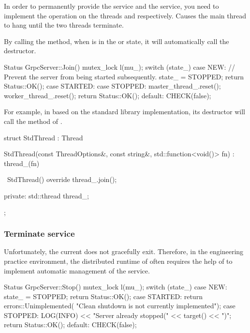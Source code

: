 \begin{content}
In order to permanently provide the  service and the  service, you need to implement the  operation on the threads  and  respectively. Causes the main thread to hang until the two threads terminate.

By calling the  method, when  is in the  or  state, it will automatically call the  destructor.

\begin{leftbar}
\begin{c++}
Status GrpcServer::Join() {
  mutex_lock l(mu_);
  switch (state_) {
    case NEW:
      // Prevent the server from being started subsequently.
      state_ = STOPPED;
      return Status::OK();
    case STARTED:
    case STOPPED:
      master_thread_.reset();
      worker_thread_.reset();
      return Status::OK();
    default:
      CHECK(false);
  }
}
\end{c++}
\end{leftbar}

For example, in  based on the  standard library implementation, its destructor will call the  method of .

\begin{leftbar}
\begin{c++}
struct StdThread : Thread {
  StdThread(const ThreadOptions&, const string&, 
      std::function<void()> fn)
    : thread_(fn) {
  }

  ~StdThread() override { 
    thread_.join(); 
  }

 private:
  std::thread thread_;
};
\end{c++}
\end{leftbar}

\subsubsection{Terminate service}

Unfortunately, the current  does not gracefully exit. Therefore, in the engineering practice environment, the distributed runtime of \tf{} often requires the help of  to implement automatic management of the  service.

\begin{leftbar}
\begin{c++}
Status GrpcServer::Stop() {
  mutex_lock l(mu_);
  switch (state_) {
    case NEW:
      state_ = STOPPED;
      return Status::OK();
    case STARTED:
      return errors::Unimplemented(
          "Clean shutdown is not currently implemented");
    case STOPPED:
      LOG(INFO) << "Server already stopped(" << target() << ")";
      return Status::OK();
    default:
      CHECK(false);
  }
}
\end{c++}
\end{leftbar}


\end{content}
